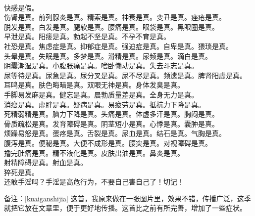 \begin{poem}[快感是假]\label{kuaiganshijia}
    \centering~\\
    快感是假。 \\ 伤肾是真。前列腺炎是真。精索是真。神衰是真。变丑是真。痤疮是真。 \\ 脱发是真。白发是真。腿软是真。腰痛是真。眼袋是真。黑眼圈是真。 \\ 早泄是真。阳痿是真。勃起不坚是真。不孕不育是真。 \\ 社恐是真。焦虑症是真。抑郁症是真。强迫症是真。自卑是真。猥琐是真。 \\ 头晕是真。失眠是真。多梦是真。滑精是真。尿频是真。滴白是真。 \\ 阴囊潮湿是真。小腹胀痛是真。嗜卧懒动是真。失去斗志是真。 \\ 尿等待是真。尿急是真。尿分叉是真。尿不尽是真。频遗是真。脾肾阳虚是真。 \\ 耳鸣是真。肤色晦暗是真。双眼无神是真。身体发臭是真。 \\ 手脚易发麻是真。健忘是真。晨勃质量差是真。全身无力是真。 \\ 消瘦是真。虚胖是真。疑病是真。易疲劳是真。抵抗力下降是真。 \\ 死精弱精是真。脑力下降是真。头痛是真。体虚多汗是真。胸闷是真。 \\ 骨质疏松是真。发育障碍是真。阴茎短小是真。心悸是真。囊肿是真。 \\ 烦躁易怒是真。蛋疼是真。舌裂是真。尿血是真。结石是真。气胸是真。 \\ 腹泻是真。便秘是真。大便不成形是真。腰突是真。对视障碍是真。 \\ 撸完肚痛是真。精不液化是真。皮肤出油是真。鼻炎是真。 \\ 射精障碍是真。射血是真。 \\ 猝死是真。 \\ 还敢手淫吗？手淫是高危行为，不要自己害自己了！切记！
\end{poem}

备注：\ref{kuaiganshijia} 这首，我原来做在一张图片里，效果不错，传播广泛，这季就把它放在文章里，便于更好地传播。这首比之前有所完善，增加了一些症状。
